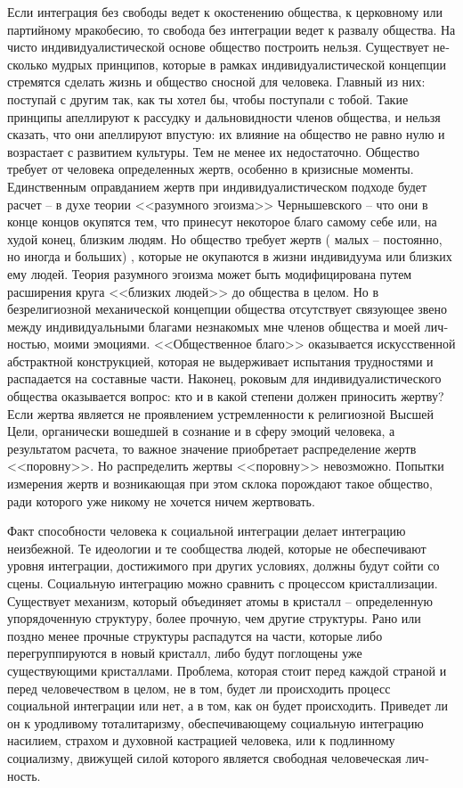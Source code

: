 \documentclass{book}
\begin{document}
Если интеграция без свободы ведет к окостенению общест­ва, к церковному или партийному мракобесию, то свобода без интеграции ведет к развалу общества. На чисто индивидуали­стической основе общество построить нельзя. Существует не­сколько мудрых принципов, которые в рамках индивидуали­стической концепции стремятся сделать жизнь и общество снос­ной для человека. Главный из них: поступай с другим так, как ты хотел бы, чтобы поступали с тобой. Такие принципы апел­лируют к рассудку и дальновидности членов общества, и нель­зя сказать, что они апеллируют впустую: их влияние на общест­во не равно нулю и возрастает с развитием культуры. Тем не менее их недостаточно. Общество требует от человека опре­деленных жертв, особенно в кризисные моменты. Единственным оправданием жертв при индивидуалистическом подходе будет расчет -- в духе теории <<разумного эгоизма>> Чернышевского -- что они в конце концов окупятся тем, что принесут некоторое благо самому себе или, на худой конец, близким людям. Но об­щество требует жертв (
малых -- постоянно, но иногда и боль­ших) , которые не окупаются в жизни индивидуума или близ­ких ему людей. Теория разумного эгоизма может быть моди­фицирована путем расширения круга <<близких людей>> до об­щества в целом. Но в безрелигиозной механической концеп­ции общества отсутствует связующее звено между индивиду­альными благами незнакомых мне членов общества и моей лич­ностью, моими эмоциями. <<Общественное благо>> оказывается искусственной абстрактной конструкцией, которая не выдер­живает испытания трудностями и распадается на составные части. Наконец, роковым для индивидуалистического общест­ва оказывается вопрос: кто и в какой степени должен прино­сить жертву? Если жертва является не проявлением устремлен­ности к религиозной Высшей Цели, органически вошедшей в сознание и в сферу эмоций человека, а результатом расчета, то важное значение приобретает распределение жертв <<поров­ну>>. Но распределить жертвы <<поровну>> невозможно. Попыт­ки измерения жертв и возникающая при этом склока порож­дают такое 
общество,
 ради которого уже никому не хочется ничем жертвовать.

Факт способности человека к социальной интеграции делает интеграцию неизбежной. Те идеологии и те сообщества людей, которые не обеспечивают уровня интеграции, достижимого при других условиях, должны будут сойти со сцены. Социаль­ную интеграцию можно сравнить с процессом кристаллизации. Существует механизм, который объединяет атомы в кристалл -- определенную упорядоченную структуру, более прочную, чем другие структуры. Рано или поздно менее прочные структуры распадутся на части, которые либо перегруппируются в новый кристалл, либо будут поглощены уже существующими крис­таллами. Проблема, которая стоит перед каждой страной и перед человечеством в целом, не в том, будет ли происходить про­цесс социальной интеграции или нет, а в том, как  он будет про­исходить. Приведет ли он к уродливому тоталитаризму, обеспечивающему социальную интеграцию насилием, страхом и духов­ной кастрацией человека, или к подлинному социализму, дви­жущей силой которого является свободная человеческая лич­ность.
\end{document}
